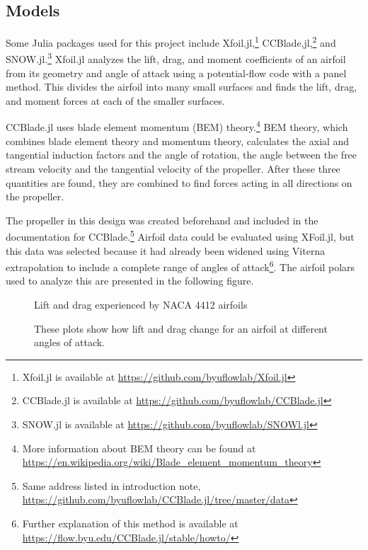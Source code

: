 \documentclass[journal ]{new-aiaa}
\begin{document}
\subsection{Models}

Some Julia packages used for this project include Xfoil.jl,\footnote{Xfoil.jl is available at \url{https://github.com/byuflowlab/Xfoil.jl}} CCBlade,jl,\footnote{CCBlade.jl is available at \url{https://github.com/byuflowlab/CCBlade.jl}} and SNOW.jl.\footnote{SNOW.jl is available at \url{https://github.com/byuflowlab/SNOWl.jl}} Xfoil.jl analyzes the lift, drag, and moment coefficients of an airfoil from its geometry and angle of attack using a potential-flow code with a panel method. This divides the airfoil into many small surfaces and finds the lift, drag, and moment forces at each of the smaller surfaces. 

CCBlade.jl uses blade element momentum (BEM) theory.\footnote{More information about BEM theory can be found at \url{https://en.wikipedia.org/wiki/Blade_element_momentum_theory}} BEM theory, which combines blade element theory and momentum theory, calculates the axial and tangential induction factors and the angle of rotation, the angle between the free stream velocity and the tangential velocity of the propeller. After these three quantities are found, they are combined to find forces acting in all directions on the propeller\cite{CCBlade}.

The propeller in this design was created beforehand and included in the documentation for CCBlade.\footnote{Same address listed in introduction note, \url{https://github.com/byuflowlab/CCBlade.jl/tree/master/data}} Airfoil data could be evaluated using XFoil.jl, but this data was selected because it had already been widened using Viterna extrapolation to include a complete range of angles of attack\footnote{Further explanation of this method is available at \url{https://flow.byu.edu/CCBlade.jl/stable/howto/}}. The airfoil polars used to analyze this are presented in the following figure. 

\begin{figure}[H]
\centering
	\caption{Lift and drag experienced by NACA 4412 airfoils}
	\captionsetup{aboveskip=0pt,font=it}
	\caption*{These plots show how lift and drag change for an airfoil at different angles of attack.}
	\label{afplot}
\end{figure}
\end{document}
